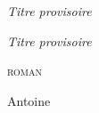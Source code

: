 
\thispagestyle{empty}
\null\vfill
\begin{center}{\Large\itshape Titre provisoire}\end{center}
\vfill\null
\cleardoublepage

\thispagestyle{empty}
\null\vspace{0.18\textheight}
\begin{center}
  {\fontsize{26}{30}\selectfont\itshape Titre provisoire\par}
  \vspace{1.2\baselineskip}
  \ornementpartie\par
  \vspace{1.2\baselineskip}
  {\small\scshape roman\par}
  \vfill
  {\large Antoine\par}
\end{center}
\cleardoublepage

